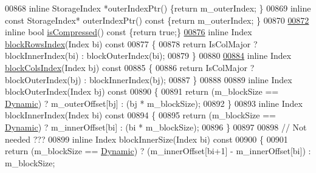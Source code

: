 \begin{DoxyCode}
00868     \textcolor{keyword}{inline} StorageIndex *outerIndexPtr() \{\textcolor{keywordflow}{return} m\_outerIndex; \}
00869     \textcolor{keyword}{inline} \textcolor{keyword}{const} StorageIndex* outerIndexPtr()\textcolor{keyword}{ const }\{\textcolor{keywordflow}{return} m\_outerIndex; \}
00870 
\hyperlink{group___sparse_core___module_a3acfdd3edc02e4347402a8d343131b9e}{00872}     \textcolor{keyword}{inline} \textcolor{keywordtype}{bool} \hyperlink{group___sparse_core___module_a3acfdd3edc02e4347402a8d343131b9e}{isCompressed}()\textcolor{keyword}{ const }\{\textcolor{keywordflow}{return} \textcolor{keyword}{true};\}
\hyperlink{group___sparse_core___module_ad43927292bc7b1e53cc98d4559838c96}{00876}     \textcolor{keyword}{inline} Index \hyperlink{group___sparse_core___module_ad43927292bc7b1e53cc98d4559838c96}{blockRowsIndex}(Index bi)\textcolor{keyword}{ const}
00877 \textcolor{keyword}{    }\{
00878       \textcolor{keywordflow}{return} IsColMajor ? blockInnerIndex(bi) : blockOuterIndex(bi);
00879     \}
00880 
\hyperlink{group___sparse_core___module_a6310ee4a4aa6f3689eaed0395d0db35e}{00884}     \textcolor{keyword}{inline} Index \hyperlink{group___sparse_core___module_a6310ee4a4aa6f3689eaed0395d0db35e}{blockColsIndex}(Index bj)\textcolor{keyword}{ const}
00885 \textcolor{keyword}{    }\{
00886       \textcolor{keywordflow}{return} IsColMajor ? blockOuterIndex(bj) : blockInnerIndex(bj);
00887     \}
00888 
00889     \textcolor{keyword}{inline} Index blockOuterIndex(Index bj)\textcolor{keyword}{ const}
00890 \textcolor{keyword}{    }\{
00891       \textcolor{keywordflow}{return} (m\_blockSize == \hyperlink{namespace_eigen_ad81fa7195215a0ce30017dfac309f0b2}{Dynamic}) ? m\_outerOffset[bj] : (bj * m\_blockSize);
00892     \}
00893     \textcolor{keyword}{inline} Index blockInnerIndex(Index bi)\textcolor{keyword}{ const}
00894 \textcolor{keyword}{    }\{
00895       \textcolor{keywordflow}{return} (m\_blockSize == \hyperlink{namespace_eigen_ad81fa7195215a0ce30017dfac309f0b2}{Dynamic}) ? m\_innerOffset[bi] : (bi * m\_blockSize);
00896     \}
00897 
00898     \textcolor{comment}{// Not needed ???}
00899     \textcolor{keyword}{inline} Index blockInnerSize(Index bi)\textcolor{keyword}{ const}
00900 \textcolor{keyword}{    }\{
00901       \textcolor{keywordflow}{return} (m\_blockSize == \hyperlink{namespace_eigen_ad81fa7195215a0ce30017dfac309f0b2}{Dynamic}) ? (m\_innerOffset[bi+1] - m\_innerOffset[bi]) : m\_blockSize;

\end{DoxyCode}
